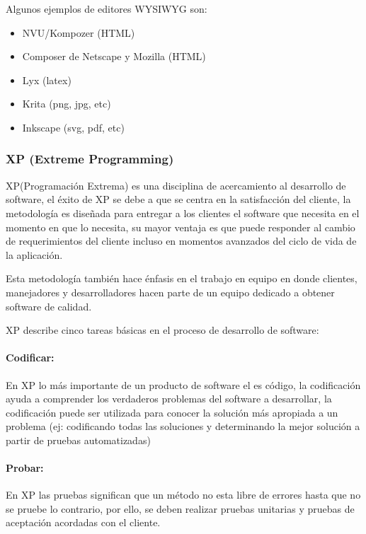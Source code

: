 Algunos ejemplos de editores WYSIWYG son:

\begin{itemize}

	\item NVU/Kompozer (HTML)
	\item Composer de Netscape y Mozilla (HTML)
	\item Lyx (latex)
	\item Krita (png, jpg, etc)
	\item Inkscape (svg, pdf, etc)

\end{itemize}


\subsubsection*{XP (Extreme Programming) \cite{xp} }

XP(Programación Extrema) es una disciplina de acercamiento al desarrollo de software, el éxito de XP se debe a que se centra en la satisfacción del cliente, la metodología es diseñada para entregar a los clientes el software que necesita en el momento en que lo necesita, su mayor ventaja es que puede responder al cambio de requerimientos del cliente incluso en momentos avanzados del ciclo de vida de la aplicación.

Esta metodología también hace énfasis en el trabajo en equipo en donde clientes, manejadores y desarrolladores hacen parte de un equipo dedicado a obtener software de calidad.

XP describe cinco tareas básicas en el proceso de desarrollo de software:

\paragraph{Codificar:} En XP lo más importante de un producto de software el es código, la codificación ayuda a comprender los verdaderos problemas del software a desarrollar, la codificación puede ser utilizada para conocer la solución más apropiada a un problema (ej: codificando todas las soluciones y determinando la mejor solución a partir de pruebas automatizadas)

\paragraph{Probar:} En XP las pruebas significan que un método no esta libre de errores hasta que no se pruebe lo contrario, por ello, se deben realizar pruebas unitarias y pruebas de aceptación acordadas con el cliente.

